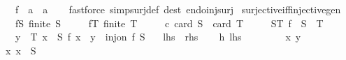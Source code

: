 \begin{isabellebody}
\ \ \ f\ {\isacharcolon}{\kern0pt}{\isacharcolon}{\kern0pt}\ {\isachardoublequoteopen}{\isacharprime}{\kern0pt}a\ {\isasymRightarrow}\ {\isacharprime}{\kern0pt}a{\isachardoublequoteclose}\isanewline
%
\isadelimproof
\ \ %
\endisadelimproof
%
\isatagproof
{}\isamarkupfalse%
\ {\isacharparenleft}{\kern0pt}fastforce\ simp{\isacharcolon}{\kern0pt}surj{\isacharunderscore}{\kern0pt}def\ dest{\isacharbang}{\kern0pt}{\isacharcolon}{\kern0pt}\ endo{\isacharunderscore}{\kern0pt}inj{\isacharunderscore}{\kern0pt}surj{\isacharparenright}{\kern0pt}%
\endisatagproof
{\isafoldproof}%
%
\isadelimproof
\isanewline
%
\endisadelimproof
\isanewline
{}\isamarkupfalse%
\ surjective{\isacharunderscore}{\kern0pt}iff{\isacharunderscore}{\kern0pt}injective{\isacharunderscore}{\kern0pt}gen{\isacharcolon}{\kern0pt}\isanewline
\ \ \ fS{\isacharcolon}{\kern0pt}\ {\isachardoublequoteopen}finite\ S{\isachardoublequoteclose}\isanewline
\ \ \ \ \ fT{\isacharcolon}{\kern0pt}\ {\isachardoublequoteopen}finite\ T{\isachardoublequoteclose}\isanewline
\ \ \ \ \ c{\isacharcolon}{\kern0pt}\ {\isachardoublequoteopen}card\ S\ {\isacharequal}{\kern0pt}\ card\ T{\isachardoublequoteclose}\isanewline
\ \ \ \ \ ST{\isacharcolon}{\kern0pt}\ {\isachardoublequoteopen}f\ {\isacharbackquote}{\kern0pt}\ S\ {\isasymsubseteq}\ T{\isachardoublequoteclose}\isanewline
\ \ \ {\isachardoublequoteopen}{\isacharparenleft}{\kern0pt}{\isasymforall}y\ {\isasymin}\ T{\isachardot}{\kern0pt}\ {\isasymexists}x\ {\isasymin}\ S{\isachardot}{\kern0pt}\ f\ x\ {\isacharequal}{\kern0pt}\ y{\isacharparenright}{\kern0pt}\ {\isasymlongleftrightarrow}\ inj{\isacharunderscore}{\kern0pt}on\ f\ S{\isachardoublequoteclose}\isanewline
\ \ {\isacharparenleft}{\kern0pt}\ {\isachardoublequoteopen}{\isacharquery}{\kern0pt}lhs\ {\isasymlongleftrightarrow}\ {\isacharquery}{\kern0pt}rhs{\isachardoublequoteclose}{\isacharparenright}{\kern0pt}\isanewline
%
\isadelimproof
%
\endisadelimproof
%
\isatagproof
{}\isamarkupfalse%
\isanewline
\ \ \isamarkupfalse%
\ h{\isacharcolon}{\kern0pt}\ {\isachardoublequoteopen}{\isacharquery}{\kern0pt}lhs{\isachardoublequoteclose}\isanewline
\ \ \isacommand{{\isacharbraceleft}{\kern0pt}}\isamarkupfalse%
\isanewline
\ \ \ \ \isamarkupfalse%
\ x\ y\isanewline
\ \ \ \ \isamarkupfalse%
\ x{\isacharcolon}{\kern0pt}\ {\isachardoublequoteopen}x\ {\isasymin}\ S{\isachardoublequoteclose}\isanewline
\ \ \ \ \isamarkupfalse%

\end{isabellebody}

